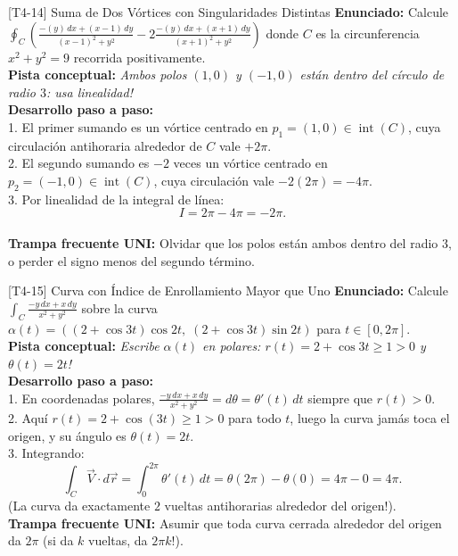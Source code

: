\documentclass[11pt,a4paper]{article}
\begin{document}
\begin{ejerciciobox}{[T4-14] Suma de Dos Vórtices con Singularidades Distintas}
\textbf{Enunciado:} Calcule $\oint_C \left( \frac{-(y)\,dx + (x-1)\,dy}{(x-1)^2 + y^2} - 2\frac{-(y)\,dx + (x+1)\,dy}{(x+1)^2 + y^2} \right)$ donde $C$ es la circunferencia $x^2 + y^2 = 9$ recorrida positivamente.\\[0.2cm]
\textbf{Pista conceptual:} \emph{Ambos polos $(1,0)$ y $(-1,0)$ están dentro del círculo de radio $3$: usa linealidad!}\\[0.2cm]
\textbf{Desarrollo paso a paso:}\\
1. El primer sumando es un vórtice centrado en $p_1 = (1,0) \in \operatorname{int}(C)$, cuya circulación antihoraria alrededor de $C$ vale $+2\pi$.\\
2. El segundo sumando es $-2$ veces un vórtice centrado en $p_2 = (-1,0) \in \operatorname{int}(C)$, cuya circulación vale $-2(2\pi) = -4\pi$.\\
3. Por linealidad de la integral de línea:\\
$$I = 2\pi - 4\pi = -2\pi.$$\\[0.2cm]
\textbf{Trampa frecuente UNI:} Olvidar que los polos están ambos dentro del radio $3$, o perder el signo menos del segundo término.
\end{ejerciciobox}

\begin{ejerciciobox}{[T4-15] Curva con Índice de Enrollamiento Mayor que Uno}
\textbf{Enunciado:} Calcule $\int_C \frac{-y\,dx + x\,dy}{x^2+y^2}$ sobre la curva $\alpha(t) = ((2 + \cos 3t)\cos 2t,\; (2 + \cos 3t)\sin 2t)$ para $t \in [0, 2\pi]$.\\[0.2cm]
\textbf{Pista conceptual:} \emph{Escribe $\alpha(t)$ en polares: $r(t) = 2 + \cos 3t \ge 1 > 0$ y $\theta(t) = 2t$!}\\[0.2cm]
\textbf{Desarrollo paso a paso:}\\
1. En coordenadas polares, $\frac{-y\,dx + x\,dy}{x^2+y^2} = d\theta = \theta'(t)\,dt$ siempre que $r(t) > 0$.\\
2. Aquí $r(t) = 2 + \cos(3t) \ge 1 > 0$ para todo $t$, luego la curva jamás toca el origen, y su ángulo es $\theta(t) = 2t$.\\
3. Integrando:\\
$$\int_C \vec{V}\cdot d\vec{r} = \int_0^{2\pi} \theta'(t)\,dt = \theta(2\pi) - \theta(0) = 4\pi - 0 = 4\pi.$$ (La curva da exactamente $2$ vueltas antihorarias alrededor del origen!).\\[0.2cm]
\textbf{Trampa frecuente UNI:} Asumir que toda curva cerrada alrededor del origen da $2\pi$ (si da $k$ vueltas, da $2\pi k$!).
\end{ejerciciobox}
\end{document}

